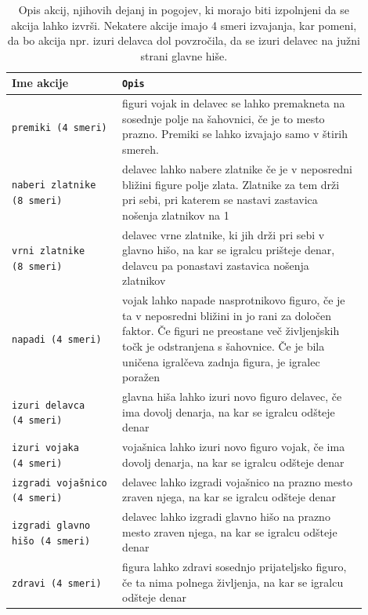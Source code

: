 \documentclass[a4paper, 12pt]{book}
\begin{document}
\begin{table}
	\begin{center}
		\begin{tabular}{p{0.28\linewidth}|p{0.62\linewidth}}
			Ime akcije                          & {\tt Opis} \\ \hline
			{\tt premiki (4~smeri)}             & figuri vojak in delavec se lahko premakneta na sosednje polje na šahovnici, če je to mesto prazno.
												Premiki se lahko izvajajo samo v štirih smereh. \\
			{\tt naberi zlatnike (8~smeri)}     & delavec lahko nabere zlatnike če je v neposredni bližini figure polje zlata.
												Zlatnike za tem drži pri sebi, pri katerem se nastavi zastavica nošenja zlatnikov na 1\\
			{\tt vrni zlatnike (8~smeri)}       & delavec vrne zlatnike, ki jih drži pri sebi v glavno hišo, na kar se igralcu prišteje denar, delavcu pa ponastavi zastavica nošenja zlatnikov\\
			{\tt napadi (4~smeri)}              & vojak lahko napade nasprotnikovo figuro, če je ta v neposredni bližini in jo rani za določen faktor. 
												Če figuri ne preostane več življenjskih točk je odstranjena s šahovnice. Če je bila uničena igralčeva zadnja figura, je igralec poražen \\
			{\tt izuri delavca (4~smeri)}       & glavna hiša lahko izuri novo figuro delavec, če ima dovolj denarja, na kar se igralcu odšteje denar\\
			{\tt izuri vojaka (4~smeri)}        & vojašnica lahko izuri novo figuro vojak, če ima dovolj denarja, na kar se igralcu odšteje denar \\
			{\tt izgradi vojašnico (4~smeri)}   & delavec lahko izgradi vojašnico na prazno mesto zraven njega, na kar se igralcu odšteje denar \\
			{\tt izgradi glavno hišo (4~smeri)} & delavec lahko izgradi glavno hišo na prazno mesto zraven njega, na kar se igralcu odšteje denar \\
			{\tt zdravi (4~smeri)}              & figura lahko zdravi sosednjo prijateljsko figuro, če ta nima polnega življenja, na kar se igralcu odšteje denar\\
		\end{tabular}
	\end{center}
	\caption{Opis akcij, njihovih dejanj in pogojev, ki morajo biti izpolnjeni da se akcija lahko izvrši. Nekatere akcije imajo 4 smeri izvajanja, kar pomeni, da bo akcija npr. izuri delavca dol povzročila, da se izuri delavec na južni strani glavne hiše.}
	\label{tableActions}
\end{table}
\end{document}
